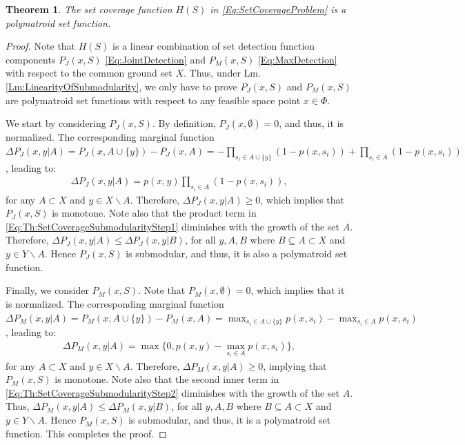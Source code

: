 \documentclass[letterpaper, 10 pt, conference]{ieeeconf}
\newtheorem{theorem}{Theorem}
\begin{document}
\begin{theorem}\label{Th:SetCoverageSubmodularity}
The set coverage function $H(S)$ in \eqref{Eq:SetCoverageProblem} is a polymatroid set function.
\end{theorem}

\begin{proof}
Note that $H(S)$ is a linear combination of set detection function components $P_J(x,S)$ \eqref{Eq:JointDetection} and $P_M(x,S)$ \eqref{Eq:MaxDetection} with respect to the common ground set $X$. Thus, under Lm. \ref{Lm:LinearityOfSubmodularity}, we only have to prove $P_J(x,S)$ and $P_M(x,S)$ are polymatroid set functions with respect to any feasible space point $x\in\Phi$. 

We start by considering $P_J(x,S)$. By definition, $P_J(x,\emptyset) = 0$, and thus, it is normalized. The corresponding marginal function $\Delta P_J(x,y \vert A) = P_J(x,A\cup\{y\}) - P_J(x,A) =  -\prod_{s_i\in A\cup\{y\}}(1-p(x,s_i)) +\prod_{s_i\in A}(1-p(x,s_i))$, leading to:
\begin{align}
\Delta P_J(x,y \vert A)  = p(x,y)\prod_{s_i\in A}(1-p(x,s_i)), \label{Eq:Th:SetCoverageSubmodularityStep1}
\end{align}
for any $A \subset X$ and $y\in X\backslash A$. Therefore, $\Delta P_J(x,y \vert A) \geq 0$, which implies that $P_J(x,S)$ is monotone. Note also that the product term in \eqref{Eq:Th:SetCoverageSubmodularityStep1} diminishes with the growth of the set $A$. Therefore, $\Delta P_J(x,y \vert A) \leq \Delta P_J(x,y \vert B)$, for all $y,A,B$ where $B\subseteq A \subset X$ and $y\in Y\backslash A$. Hence $P_J(x,S)$ is submodular, and thus, it is also a polymatroid set function.

Finally, we consider $P_M(x,S)$. Note that $P_M(x,\emptyset) = 0$, which implies that it is normalized. The corresponding marginal function 
$\Delta P_M(x,y \vert A) = P_M(x,A\cup\{y\}) - P_M(x,A) = \max_{s_i\in A\cup\{y\}} p(x,s_i) - \max_{s_i\in A} p(x,s_i)$, leading to:
\begin{align}
\Delta P_M(x,y \vert A) = \max\{0,p(x,y)-\max_{s_i\in A} p(x,s_i)\}, \label{Eq:Th:SetCoverageSubmodularityStep2}
\end{align}
for any $A \subset X$ and $y\in X\backslash A$. Therefore, $\Delta P_M(x,y \vert A) \geq 0$, implying that $P_M(x,S)$ is monotone. Note also that the second inner term in \eqref{Eq:Th:SetCoverageSubmodularityStep2} diminishes with the growth of the set $A$. Thus, $\Delta P_M(x,y \vert A) \leq \Delta P_M(x,y \vert B)$, for all $y,A,B$ where $B \subseteq A \subset X$ and $y \in Y\backslash A$. Hence $P_M(x,S)$ is submodular, and thus, it is a polymatroid set function. This completes the proof.
\end{proof}
\end{document}
